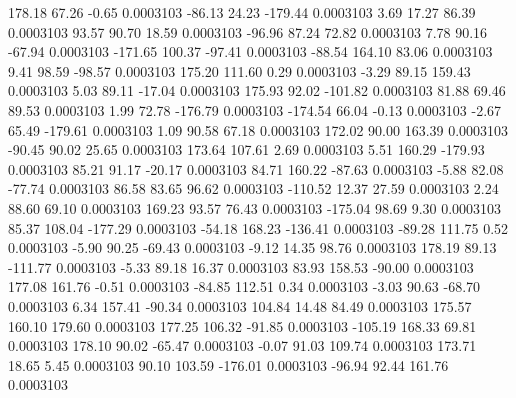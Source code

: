       178.18       67.26       -0.65     0.0003103
      -86.13       24.23     -179.44     0.0003103
        3.69       17.27       86.39     0.0003103
       93.57       90.70       18.59     0.0003103
      -96.96       87.24       72.82     0.0003103
        7.78       90.16      -67.94     0.0003103
     -171.65      100.37      -97.41     0.0003103
      -88.54      164.10       83.06     0.0003103
        9.41       98.59      -98.57     0.0003103
      175.20      111.60        0.29     0.0003103
       -3.29       89.15      159.43     0.0003103
        5.03       89.11      -17.04     0.0003103
      175.93       92.02     -101.82     0.0003103
       81.88       69.46       89.53     0.0003103
        1.99       72.78     -176.79     0.0003103
     -174.54       66.04       -0.13     0.0003103
       -2.67       65.49     -179.61     0.0003103
        1.09       90.58       67.18     0.0003103
      172.02       90.00      163.39     0.0003103
      -90.45       90.02       25.65     0.0003103
      173.64      107.61        2.69     0.0003103
        5.51      160.29     -179.93     0.0003103
       85.21       91.17      -20.17     0.0003103
       84.71      160.22      -87.63     0.0003103
       -5.88       82.08      -77.74     0.0003103
       86.58       83.65       96.62     0.0003103
     -110.52       12.37       27.59     0.0003103
        2.24       88.60       69.10     0.0003103
      169.23       93.57       76.43     0.0003103
     -175.04       98.69        9.30     0.0003103
       85.37      108.04     -177.29     0.0003103
      -54.18      168.23     -136.41     0.0003103
      -89.28      111.75        0.52     0.0003103
       -5.90       90.25      -69.43     0.0003103
       -9.12       14.35       98.76     0.0003103
      178.19       89.13     -111.77     0.0003103
       -5.33       89.18       16.37     0.0003103
       83.93      158.53      -90.00     0.0003103
      177.08      161.76       -0.51     0.0003103
      -84.85      112.51        0.34     0.0003103
       -3.03       90.63      -68.70     0.0003103
        6.34      157.41      -90.34     0.0003103
      104.84       14.48       84.49     0.0003103
      175.57      160.10      179.60     0.0003103
      177.25      106.32      -91.85     0.0003103
     -105.19      168.33       69.81     0.0003103
      178.10       90.02      -65.47     0.0003103
       -0.07       91.03      109.74     0.0003103
      173.71       18.65        5.45     0.0003103
       90.10      103.59     -176.01     0.0003103
      -96.94       92.44      161.76     0.0003103
